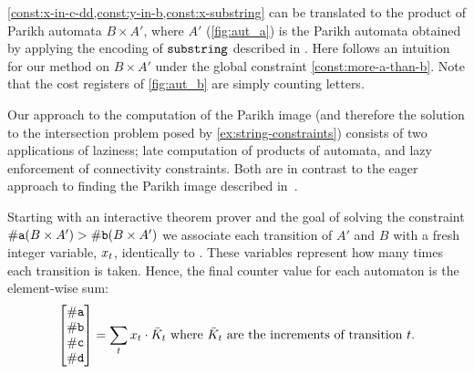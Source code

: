 \cref{const:x-in-c-dd,const:y-in-b,const:x-substring} can be translated to the product of Parikh automata $B \times A'$, where $A'$ (\cref{fig:aut_a}) is the Parikh automata obtained by applying the encoding of $\operatorname{\mathtt{substring}}$ described in \cite{ostrich-plus}. Here follows an intuition for our method on $B \times A'$ under the global constraint \cref{const:more-a-than-b}. Note that the cost registers of \cref{fig:aut_b} are simply counting letters.

Our approach to the computation of the Parikh image (and therefore the solution to the intersection problem posed by \cref{ex:string-constraints}) consists of two applications of laziness; late computation of products of automata, and lazy enforcement of connectivity constraints. Both are in contrast to the eager approach to finding the Parikh image described in~\cite{generate-parikh-image}.

Starting with an interactive theorem prover and the goal of solving the constraint $\#\text{\texttt{a}}(B \times A') > \#\text{\texttt{b}}(B \times A')$ we associate each transition of $A'$ and $B$ with a fresh integer variable, $x_t$, identically to \cite{generate-parikh-image}. These variables represent how many times each transition is taken. Hence, the final counter value for each automaton is the element-wise sum:
\begin{equation}
\begin{bmatrix} \#\text{\texttt{a}} \\ \#\text{\texttt{b}} \\ \#\text{\texttt{c}} \\ \#\text{\texttt{d}} \end{bmatrix} = \sum_t x_t \cdot \bar{K}_t \text{ where $\bar{K}_t$ are the increments of transition $t$}.
\end{equation}


